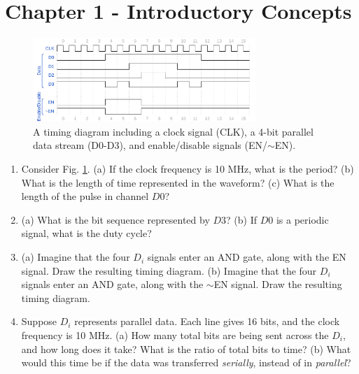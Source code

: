 \documentclass[10pt]{article}
\begin{document}
\maketitle

\section{Chapter 1 - Introductory Concepts}
\begin{figure}[ht]
\centering
\includegraphics[width=0.75\textwidth]{timingExample1.pdf}
\caption{\label{fig:timing1} A timing diagram including a clock signal (CLK), a 4-bit parallel data stream (D0-D3), and enable/disable signals (EN/$\sim$EN).}
\end{figure}
\begin{enumerate}
\item Consider Fig. \ref{fig:timing1}. (a) If the clock frequency is 10 MHz, what is the period?  (b) What is the length of time represented in the waveform? (c) What is the length of the pulse in channel $D0$? \\ \vspace{2.5cm}
\item (a) What is the bit sequence represented by $D3$? (b) If $D0$ is a periodic signal, what is the duty cycle? \\ \vspace{1cm}
\item (a) Imagine that the four $D_i$ signals enter an AND gate, along with the EN signal.  Draw the resulting timing diagram. (b) Imagine that the four $D_i$ signals enter an AND gate, along with the $\sim$EN signal.  Draw the resulting timing diagram. \\ \vspace{3cm}
\item Suppose $D_i$ represents parallel data.  Each line gives 16 bits, and the clock frequency is 10 MHz.  (a) How many total bits are being sent across the $D_i$, and how long does it take?  What is the ratio of total bits to time?  (b) What would this time be if the data was transferred \textit{serially}, instead of in \textit{parallel}? \\ \vspace{2cm}
\end{enumerate}
\end{document}
